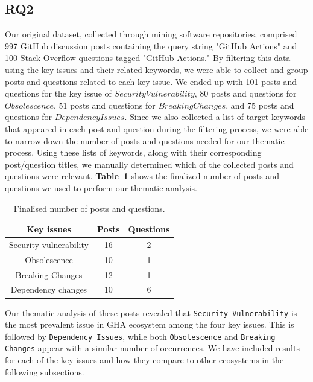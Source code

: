 \documentclass[conference]{IEEEtran}
\begin{document}
  \subsection{RQ2}
Our original dataset, collected through mining software repositories, comprised 997 GitHub discussion posts containing the query string "GitHub Actions" and 100 Stack Overflow questions tagged "GitHub Actions." By filtering this data using the key issues and their related keywords, we were able to collect and group posts and questions related to each key issue. We ended up with 101 posts and questions for the key issue of $Security Vulnerability$, 80 posts and questions for $Obsolescence$, 51 posts and questions for $Breaking Changes$, and 75 posts and questions for $Dependency Issues$. Since we also collected a list of target keywords that appeared in each post and question during the filtering process, we were able to narrow down the number of posts and questions needed for our thematic process. Using these lists of keywords, along with their corresponding post/question titles, we manually determined which of the collected posts and questions were relevant. \textbf{Table~\ref{tab:number_data}} shows the finalized number of posts and questions we used to perform our thematic analysis.
\begin{table}[H]
\centering
\caption{Finalised number of posts and questions.}
\label{tab:number_data}
\begin{tabular}{|c|c|c|}
  \hline
  \textbf{Key issues} & \textbf{Posts}  & \textbf{Questions} \\
  \hline
  \hline
    Security vulnerability & 16 &  2  \\
  \hline
   Obsolescence & 10  & 1 \\
  \hline
  \hline
   Breaking Changes & 12 & 1 \\
  \hline
  \hline
   Dependency changes & 10 & 6  \\
  \hline
\end{tabular}
\end{table}
Our thematic analysis of these posts revealed that \texttt{Security Vulnerability} is the most prevalent issue in GHA ecosystem among the four key issues. This is followed by \texttt{Dependency Issues}, while both \texttt{Obsolescence} and \texttt{Breaking Changes} appear with a similar number of occurrences. We have included results for each of the key issues and how they compare to other ecosystems in the following subsections.
\end{document}
